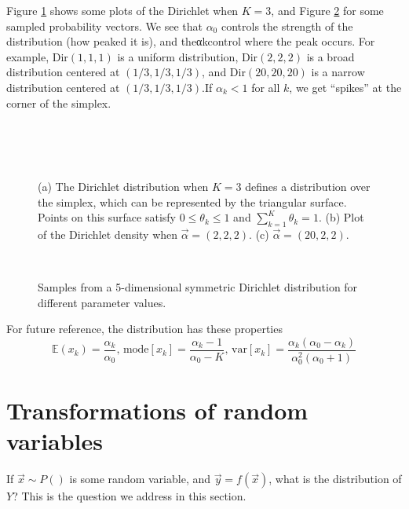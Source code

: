 Figure \ref{fig:3d-Dirichlet} shows some plots of the Dirichlet when $K=3$, and Figure \ref{fig:5d-Dirichlet} for some sampled probability vectors. We see that $\alpha_0$ controls the strength of the distribution (how peaked it is), and theαkcontrol where the peak occurs. For example, Dir$(1,1,1)$ is a uniform distribution, Dir$(2,2,2)$ is a broad distribution centered at $(1/3,1/3,1/3)$, and Dir$(20,20,20)$ is a narrow distribution centered at $(1/3,1/3,1/3)$.If $\alpha_k < 1$ for all $k$, we get “spikes” at the corner of the simplex.

\begin{figure}[hbtp]
\centering
{} \\
 \\
 \\
\caption{(a) The Dirichlet distribution when $K=3$ defines a distribution over the simplex, which can be represented by the triangular surface. Points on this surface satisfy $0 \leq \theta_k \leq 1$ and $\sum_{k=1}^K \theta_k=1$. (b) Plot of the Dirichlet density when $\vec{\alpha}=(2,2,2)$. (c) $\vec{\alpha}=(20,2,2)$.}
\label{fig:3d-Dirichlet} 
\end{figure}

\begin{figure}[hbtp]
\centering
{} \\
\caption{Samples from a 5-dimensional symmetric Dirichlet distribution for different parameter values.} 
\label{fig:5d-Dirichlet} 
\end{figure}

For future reference, the distribution has these properties
\begin{equation}\label{eqn:Dirichlet-properties}
\mathbb{E}(x_k)=\dfrac{\alpha_k}{\alpha_0} \text{, mode}[x_k]=\dfrac{\alpha_k-1}{\alpha_0-K} \text{, var}[x_k]=\dfrac{\alpha_k(\alpha_0-\alpha_k)}{\alpha_0^2(\alpha_0+1)}
\end{equation}


\section{Transformations of random variables}
If $\vec{x} \sim P()$ is some random variable, and $\vec{y}=f(\vec{x})$, what is the distribution of $Y$? This is the question we address in this section.


